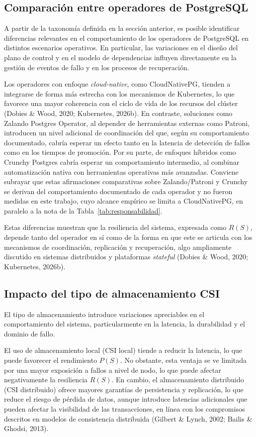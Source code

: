 \documentclass[12pt,twocolumn,letterpaper]{article}
\begin{document}
\subsection{Comparación entre operadores de PostgreSQL}
A partir de la taxonomía definida en la sección anterior, es posible identificar diferencias relevantes en el comportamiento de los operadores de PostgreSQL en distintos escenarios operativos. En particular, las variaciones en el diseño del plano de control y en el modelo de dependencias influyen directamente en la gestión de eventos de fallo y en los procesos de recuperación.

Los operadores con enfoque \textit{cloud-native}, como CloudNativePG, tienden a integrarse de forma más estrecha con los mecanismos de Kubernetes, lo que favorece una mayor coherencia con el ciclo de vida de los recursos del clúster (Dobies \& Wood, 2020; Kubernetes, 2026b). En contraste, soluciones como Zalando Postgres Operator, al depender de herramientas externas como Patroni, introducen un nivel adicional de coordinación del que, según su comportamiento documentado, cabría esperar un efecto tanto en la latencia de detección de fallos como en los tiempos de promoción. Por su parte, de enfoques híbridos como Crunchy Postgres cabría esperar un comportamiento intermedio, al combinar automatización nativa con herramientas operativas más avanzadas. Conviene subrayar que estas afirmaciones comparativas sobre Zalando/Patroni y Crunchy se derivan del comportamiento documentado de cada operador y no fueron medidas en este trabajo, cuyo alcance empírico se limita a CloudNativePG, en paralelo a la nota de la Tabla~\ref{tab:responsabilidad}.

Estas diferencias muestran que la resiliencia del sistema, expresada como $R(S)$, depende tanto del operador en sí como de la forma en que este se articula con los mecanismos de coordinación, replicación y recuperación, algo ampliamente discutido en sistemas distribuidos y plataformas \textit{stateful} (Dobies \& Wood, 2020; Kubernetes, 2026b).

\subsection{Impacto del tipo de almacenamiento CSI}
El tipo de almacenamiento introduce variaciones apreciables en el comportamiento del sistema, particularmente en la latencia, la durabilidad y el dominio de fallo.

El uso de almacenamiento local (CSI local) tiende a reducir la latencia, lo que puede favorecer el rendimiento $P(S)$. No obstante, esta ventaja se ve limitada por una mayor exposición a fallos a nivel de nodo, lo que puede afectar negativamente la resiliencia $R(S)$. En cambio, el almacenamiento distribuido (CSI distribuido) ofrece mayores garantías de persistencia y replicación, lo que reduce el riesgo de pérdida de datos, aunque introduce latencias adicionales que pueden afectar la visibilidad de las transacciones, en línea con los compromisos descritos en modelos de consistencia distribuida (Gilbert \& Lynch, 2002; Bailis \& Ghodsi, 2013).
\end{document}
